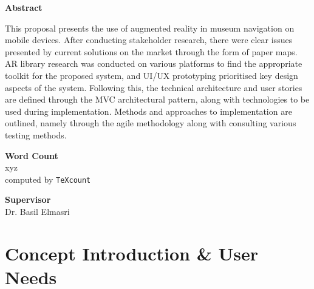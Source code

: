\documentclass[12pt]{report}
\newcommand\blankpage{%
    \null
    \thispagestyle{empty}%
    \addtocounter{page}{-1}%
    \newpage}
\begin{document}
\begin{center}        
    \large
    \textbf{Abstract}\\
\end{center}

This proposal presents the use of augmented reality in museum navigation on mobile devices. After conducting stakeholder research, there were clear issues presented by current solutions on the market through the form of paper maps. AR library research was conducted on various platforms to find the appropriate toolkit for the proposed system, and UI/UX prototyping prioritised key design aspects of the system. Following this, the technical architecture and user stories are defined through the MVC architectural pattern, along with technologies to be used during implementation. Methods and approaches to implementation are outlined, namely through the agile methodology along with consulting various testing methods.

\vspace*{1.5cm}
\begin{center}    
    \large
    \textbf{Word Count}\\
    xyz\\
    \normalsize computed by \texttt{TeXcount}
\end{center}

\vspace*{1.5cm}
\begin{center}    
    \large
    \textbf{Supervisor}\\
    \normalsize Dr. Basil Elmasri
\end{center}

\afterpage{\blankpage}


\setcounter{tocdepth}{0}
\tableofcontents

\setcounter{tocdepth}{1}
\listoffigures


\printnomenclature[1in]

\afterpage{\blankpage}


\chapter{Concept Introduction \& User Needs}

\end{document}
